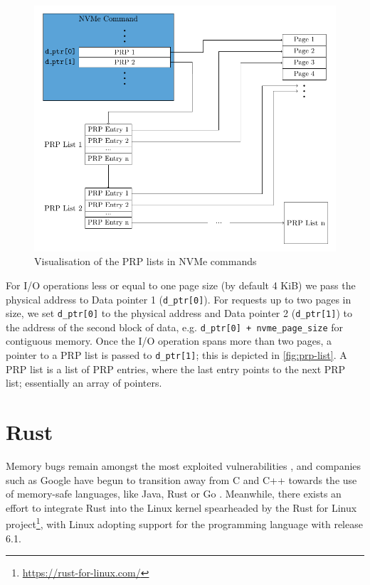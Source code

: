 \begin{figure}
  \centering
    \includegraphics[width=\textwidth]{figures/prp-list}
    \caption{Visualisation of the PRP lists in NVMe commands}
    \label{fig:prp-list}
\end{figure}

For I/O operations less or equal to one page size (by default 4 KiB) we pass the physical address to Data pointer 1 (\texttt{d\_ptr[0]}). For requests up to two pages in size, we set \texttt{d\_ptr[0]} to the physical address and Data pointer 2 (\texttt{d\_ptr[1]}) to the address of the second block of data, e.g. \texttt{d\_ptr[0] + nvme\_page\_size} for contiguous memory. Once the I/O operation spans more than two pages, a pointer to a PRP list is passed to \texttt{d\_ptr[1]}; this is depicted in \autoref{fig:prp-list}. A PRP list is a list of PRP entries, where the last entry points to the next PRP list; essentially an array of pointers.

\section{Rust}
Memory bugs remain amongst the most exploited vulnerabilities \cite{mitre}, and companies such as Google have begun to transition away from C and C++ towards the use of memory-safe languages, like Java, Rust or Go \cite{google}. Meanwhile, there exists an effort to integrate Rust into the Linux kernel spearheaded by the Rust for Linux project\footnote{\url{https://rust-for-linux.com/}}, with Linux adopting support for the programming language with release 6.1.

